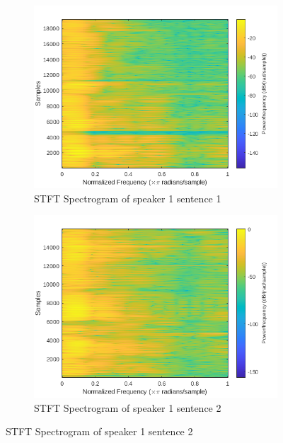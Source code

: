 \documentclass[11pt]{article}  %
\begin{document}
\begin{figure}[htb!]
	\centering
	\begin{subfigure}[b]{.4\linewidth}
		\includegraphics[width=\textwidth]{stft1.png}
		\caption{STFT Spectrogram of speaker 1 sentence 1}
		\label{fig:stft-speaker1-sent-1}
	\end{subfigure}
	\begin{subfigure}[b]{.4\linewidth}
		\includegraphics[width=\textwidth]{stft2.png}
		\caption{STFT Spectrogram of speaker 1 sentence 2}
		\label{fig:stft-speaker1-sent-2}
	\end{subfigure}


\end{figure}
\end{document}
